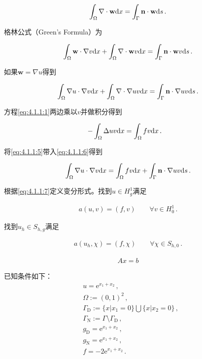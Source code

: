 \begin{align*}
  \int_{\Omega}\nabla \cdot \mathbf w \mathrm{d} x = \int_{\Gamma}\mathbf n \cdot \mathbf w \mathrm{d} s\,.
\end{align*}

格林公式（Green's Formula）为

\begin{align*}
  \int_{\Omega}\mathbf w \cdot \nabla v  \mathrm{d} x  + \int_{\Omega}\nabla\cdot\mathbf w  v  \mathrm{d} x = \int_{\Gamma}\mathbf n \cdot \mathbf w v\mathrm{d} s \,.
\end{align*}

如果$\mathbf w=\nabla u$得到

\begin{align}\label{eq:4.1.1:5}
  \int_{\Omega}\nabla u \cdot \nabla v  \mathrm{d} x  + \int_{\Omega}\nabla\cdot\nabla u  v  \mathrm{d} x = \int_{\Gamma}\mathbf n \cdot \nabla u v\mathrm{d} s \,.
\end{align}

方程\eqref{eq:4.1.1:1}两边乘以$v$并做积分得到

\begin{align}\label{eq:4.1.1:6}
  -\int_{\Omega}\Delta uv\mathrm{d} x &= \int_{\Omega}fv\mathrm{d} x\,.
\end{align}

将\eqref{eq:4.1.1:5}带入\eqref{eq:4.1.1:6}得到
   
\begin{align}\label{eq:4.1.1:7}
  \int_{\Omega}\nabla u \cdot \nabla v  \mathrm{d} x = \int_{\Omega}fv\mathrm{d} x + \int_{\Gamma}\mathbf n \cdot \nabla u v\mathrm{d} s\,.
\end{align}

根据\eqref{eq:4.1.1:7}定义变分形式。找到$u\in H^1_g$满足

\begin{align}   
  a(u,v)=(f,v) \qquad \forall v\in H^1_0\,.
\end{align}

找到$u_h\in S_{h,g}$满足

\begin{align}   
  a(u_h,\chi)=(f,\chi) \qquad \forall \chi\in S_{h,0}\,.
\end{align}

\begin{align}   
  Ax = b
\end{align}

已知条件如下：
\begin{subequations}
  \begin{align*}
   &u=\mathrm e^{x_1+x_2}\,,\\
   &\Omega:=(0,1)^2\,,\\
   &\Gamma_{\mathrm D}:=\{x|x_1=0\}\bigcup\{x|x_2=0\}\,,\\
   &\Gamma_{\mathrm N}:=\Gamma\setminus\Gamma_{\mathrm D}\,, \\
   &g_{\mathrm D}=\mathrm e^{x_1+x_2}\,,\\
   &g_{\mathrm N}=\mathrm e^{x_1+x_2}\,,\\
    &f=-2\mathrm e^{x_1+x_2}\,.
  \end{align*}
\end{subequations}


